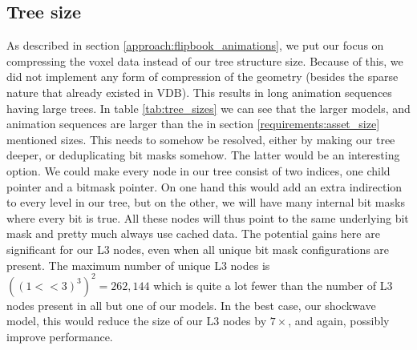 \subsection{Tree size} \label{results:tree_size}
As described in section \ref{approach:flipbook_animations}, we put our focus on compressing the voxel data instead of our tree structure size. Because of this, we did not implement any form of compression of the geometry (besides the sparse nature that already existed in VDB). This results in long animation sequences having large trees. In table \ref{tab:tree_sizes} we can see that the larger models, and animation sequences are larger than the in section \ref{requirements:asset_size} mentioned sizes. This needs to somehow be resolved, either by making our tree deeper, or deduplicating bit masks somehow. The latter would be an interesting option. We could make every node in our tree consist of two indices, one child pointer and a bitmask pointer. On one hand this would add an extra indirection to every level in our tree, but on the other, we will have many internal bit masks where every bit is true. All these nodes will thus point to the same underlying bit mask and pretty much always use cached data. The potential gains here are significant for our L3 nodes, even when all unique bit mask configurations are present. The maximum number of unique L3 nodes is $((1<<3)^3)^2 = 262,144$ which is quite a lot fewer than the number of L3 nodes present in all but one of our models. In the best case, our shockwave model, this would reduce the size of our L3 nodes by $7\times$, and again, possibly improve performance.

